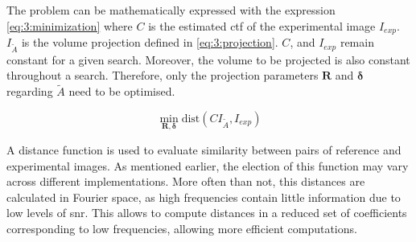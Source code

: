 \documentclass[../main.tex]{subfiles}
\begin{document}
The problem can be mathematically expressed with the expression \eqref{eq:3:minimization} where $C$ is the estimated \gls{ctf} of the experimental image $I_{exp}$. $I_{\tilde{A}}$ is the volume projection defined in \eqref{eq:3:projection}. $C$, and $I_{exp}$ remain constant for a given search. Moreover, the volume to be projected is also constant throughout a search. Therefore, only the projection parameters $\bm{R}$ and $\bm{\delta}$ regarding $\tilde{A}$ need to be optimised.

\begin{equation}\label{eq:3:minimization}
    \min_{\bm{R}, \bm{\delta}} \text{dist}(C I_{\tilde{A}} , I_{exp})
\end{equation}

A distance function is used to evaluate similarity between pairs of reference and experimental images. As mentioned earlier, the election of this function may vary across different implementations. More often than not, this distances are calculated in Fourier space, as high frequencies contain little information due to low levels of \gls{snr}. This allows to compute distances in a reduced set of coefficients corresponding to low frequencies, allowing more efficient computations.
\end{document}
